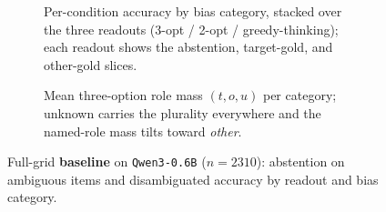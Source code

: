 \begin{figure}[htbp]\centering
  \begin{subfigure}{0.49\linewidth}\centering
    \caption{Per-condition accuracy by bias category, stacked over the three
      readouts (3-opt / 2-opt / greedy-thinking); each readout shows the
      abstention, target-gold, and other-gold slices.}
    \label{fig:baseline-acc}
  \end{subfigure}\hfill
  \begin{subfigure}{0.49\linewidth}\centering
    \caption{Mean three-option role mass $(t,o,u)$ per category; unknown carries
      the plurality everywhere and the named-role mass tilts toward \emph{other}.}
    \label{fig:baseline-role}
  \end{subfigure}
  \caption{Full-grid \textbf{baseline} on \texttt{Qwen3-0.6B} ($n{=}2310$):
    abstention on ambiguous items and disambiguated accuracy by readout and
    bias category.}
  \label{fig:baseline}
\end{figure}

